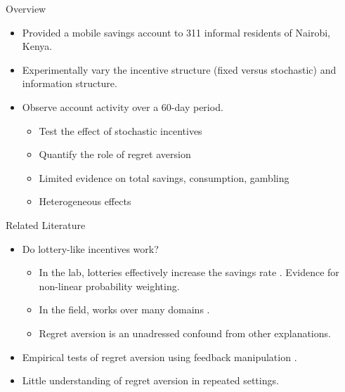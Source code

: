 \documentclass[aspectratio=169]{beamer}
\begin{document}
\begin{frame}{Overview}

	\begin{itemize}

		\item Provided a mobile savings account to 311 informal residents of Nairobi, Kenya.
		\item Experimentally vary the incentive structure (fixed versus stochastic) and information structure.
		\item Observe account activity over a 60-day period.

		\begin{itemize}
			\item Test the effect of stochastic incentives
			\item Quantify the role of regret aversion
			\item Limited evidence on total savings, consumption, gambling
			\item Heterogeneous effects
		\end{itemize}

	\end{itemize}

\end{frame}

\begin{frame}{Related Literature}
	
	\begin{itemize}

		\item Do lottery-like incentives work? 
		
		\begin{itemize}
			\item In the lab, lotteries effectively increase the savings rate \parencite{atalay_savings_2014,filiz-ozbay_lottery_2015}. Evidence for non-linear probability weighting.
			\item In the field, works over many domains \parencite{dizon_leveraging_2016,gajic_cost-effectiveness_2011,brune_effect_2015,loibl_testing_2016}.
			\item Regret aversion is an unadressed confound from other explanations.
		\end{itemize}

		\item Empirical tests of regret aversion using feedback manipulation \parencite{zeelenberg_consequences_1996,zeelenberg_consequences_2004,filiz-ozbay_auctions_2007}.
		
		\item Little understanding of regret aversion in repeated settings.


	\end{itemize}

\end{frame}
\end{document}
